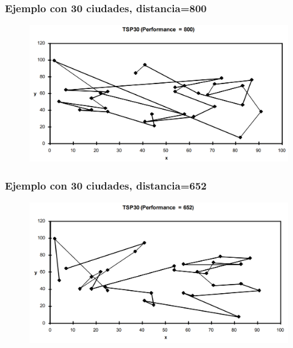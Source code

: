 \documentclass[10pt]{beamer}
\begin{document}
\begin{frame}
  \frametitle{Ejemplo con 30 ciudades, distancia=800}

  \begin{figure}[!h] 
    \centering
    \includegraphics[width=1\textwidth]{img/tsp3}
  \end{figure}

\end{frame}

\begin{frame}
  \frametitle{Ejemplo con 30 ciudades, distancia=652}

  \begin{figure}[!h] 
    \centering
    \includegraphics[width=1\textwidth]{img/tsp4}
  \end{figure}

\end{frame}
\end{document}
